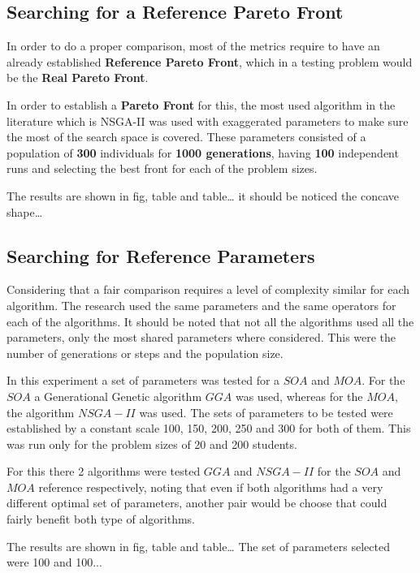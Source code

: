 \subsection{Searching for a Reference Pareto Front}

In order to do a proper comparison, most of the metrics require to have an already established \textbf{Reference Pareto Front}, which in a testing problem would be the \textbf{Real Pareto Front}.

In order to establish a \textbf{Pareto Front} for this, the most used algorithm in the literature which is NSGA-II was used with exaggerated parameters to make sure the most of the search space is covered. These parameters consisted of a population of \textbf{300} individuals for \textbf{1000 generations}, having \textbf{100} independent runs and selecting the best front for each of the problem sizes.


The results are shown in fig, table and table\dots
it should be noticed the concave shape\dots

\subsection{Searching for Reference Parameters}

Considering that a fair comparison requires a level of complexity similar for each algorithm. The research used the same parameters and the same operators for each of the algorithms. It should be noted that not all the algorithms used all the parameters, only the most shared parameters where considered. This were the number of generations or steps and the population size. 

In this experiment a set of parameters was tested for a $SOA$ and $MOA$. For the $SOA$ a Generational Genetic algorithm $GGA$ was used, whereas for the $MOA$, the algorithm $NSGA-II$ was used. The sets of parameters to be tested were established by a constant scale 100, 150, 200, 250 and 300 for both of them. This was run only for the problem sizes of 20 and 200 students.

For this there 2 algorithms were tested $GGA$ and $NSGA-II$ for the $SOA$ and $MOA$ reference respectively, noting that even if both algorithms had a very different optimal set of parameters, another pair would be choose that could fairly benefit both type of algorithms.


The results are shown in fig, table and table\dots
The set of parameters selected were 100 and 100...

